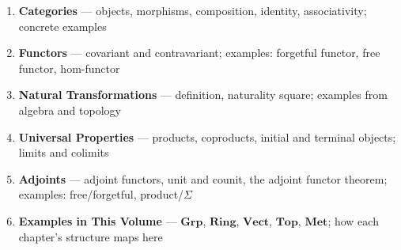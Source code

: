 \begin{tcolorbox}[
  colback=amber!6,
  colframe=amber!40,
  arc=2pt,
  left=8pt, right=8pt, top=6pt, bottom=6pt,
  title={\small\textbf{Planned Content}},
  fonttitle=\small\bfseries
]
\small
\begin{enumerate}
  \item \textbf{Categories} --- objects, morphisms, composition,
        identity, associativity; concrete examples
  \item \textbf{Functors} --- covariant and contravariant; examples:
        forgetful functor, free functor, hom-functor
  \item \textbf{Natural Transformations} --- definition,
        naturality square; examples from algebra and topology
  \item \textbf{Universal Properties} --- products, coproducts,
        initial and terminal objects; limits and colimits
  \item \textbf{Adjoints} --- adjoint functors, unit and counit,
        the adjoint functor theorem; examples: free/forgetful,
        product/$\Sigma$
  \item \textbf{Examples in This Volume} --- $\mathbf{Grp}$,
        $\mathbf{Ring}$, $\mathbf{Vect}$, $\mathbf{Top}$,
        $\mathbf{Met}$; how each chapter's structure maps here
\end{enumerate}
\end{tcolorbox}



